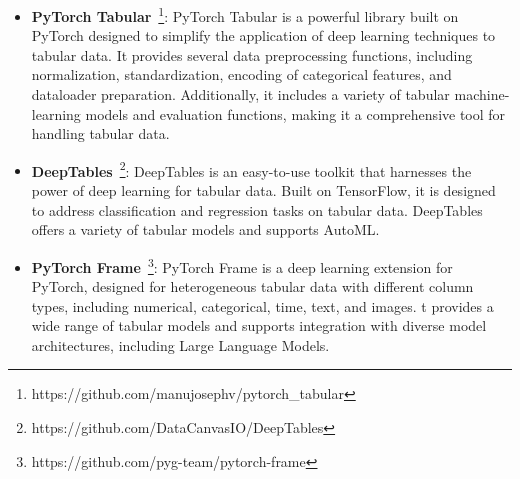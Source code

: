 \begin{itemize}[leftmargin=*]
    \item \textbf{PyTorch Tabular}~\citep{joseph2021pytorch}\footnote{https://github.com/manujosephv/pytorch\_tabular}: PyTorch Tabular is a powerful library built on PyTorch designed to simplify the application of deep learning techniques to tabular data. It provides several data preprocessing functions, including normalization, standardization, encoding of categorical features, and dataloader preparation. Additionally, it includes a variety of tabular machine-learning models and evaluation functions, making it a comprehensive tool for handling tabular data.
    \item \textbf{DeepTables}~\citep{deeptables}\footnote{https://github.com/DataCanvasIO/DeepTables}: DeepTables is an easy-to-use toolkit that harnesses the power of deep learning for tabular data. Built on TensorFlow, it is designed to address classification and regression tasks on tabular data. DeepTables offers a variety of tabular models and supports AutoML.
    \item \textbf{PyTorch Frame}~\citep{hu2024pytorch}\footnote{https://github.com/pyg-team/pytorch-frame}: PyTorch Frame is a deep learning extension for PyTorch, designed for heterogeneous tabular data with different column types, including numerical, categorical, time, text, and images. t provides a wide range of tabular models and supports integration with diverse model architectures, including Large Language Models.
\end{itemize}

